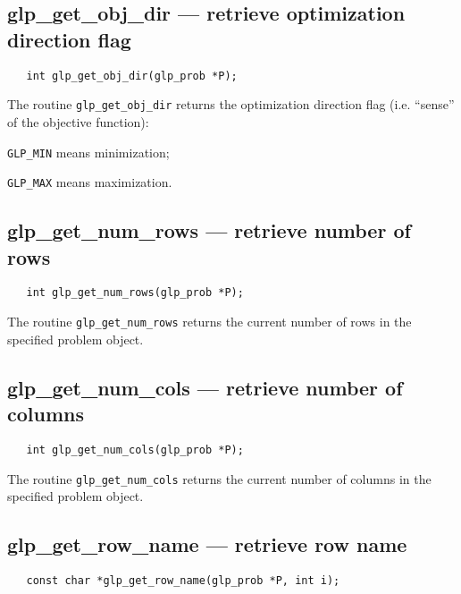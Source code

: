 \subsection{glp\_get\_obj\_dir --- retrieve optimization direction
flag}

\synopsis

\begin{verbatim}
   int glp_get_obj_dir(glp_prob *P);
\end{verbatim}

\returns

The routine \verb|glp_get_obj_dir| returns the optimization direction
flag (i.e. ``sense'' of the objective function):

\verb|GLP_MIN| means minimization;

\verb|GLP_MAX| means maximization.

\subsection{glp\_get\_num\_rows --- retrieve number of rows}

\synopsis

\begin{verbatim}
   int glp_get_num_rows(glp_prob *P);
\end{verbatim}

\returns

The routine \verb|glp_get_num_rows| returns the current number of rows
in the specified problem object.

\subsection{glp\_get\_num\_cols --- retrieve number of columns}

\synopsis

\begin{verbatim}
   int glp_get_num_cols(glp_prob *P);
\end{verbatim}

\returns

The routine \verb|glp_get_num_cols| returns the current number of
columns in the specified problem object.

\subsection{glp\_get\_row\_name --- retrieve row name}

\synopsis

\begin{verbatim}
   const char *glp_get_row_name(glp_prob *P, int i);
\end{verbatim}

